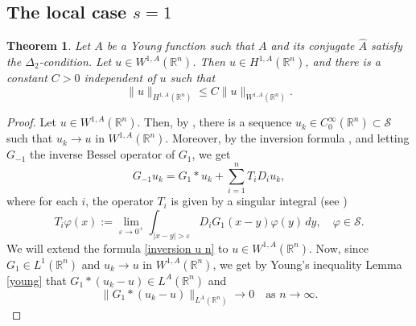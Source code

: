 \documentclass[leqno,twoside, 12pt]{amsart}
\theoremstyle{plain}
\numberwithin{equation}{section} \numberwithin{figure}{section}
\newtheorem{theorem}{Theorem}[section]
\theoremstyle{definition}
\numberwithin{equation}{section}
\begin{document}
\subsection{The local case $s=1$} 
\begin{theorem}\label{sobolev include in Bessel} Let $A$ be a Young function such that $A$ and its conjugate $\hat A$  satisfy the $\Delta_2$-condition. Let $u\in W^{1, A}(\mathbb{R}^n)$. Then $u\in H^{1, A}(\mathbb{R}^n)$, and there is a constant $C>0$ independent of $u$ such that
$$\|u\|_{H^{1, A}(\mathbb{R}^n)}\leq C\|u\|_{W^{1, A}(\mathbb{R}^n)}.$$
\end{theorem}
\begin{proof}
Let $u\in W^{1, A}(\mathbb{R}^n)$. Then, by \cite[Corollary 1.10]{G}, there is a sequence $u_k\in C_0^\infty(\mathbb{R}^n) \subset \mathcal{S}$ such that $u_k\to u$ in $W^{1, A}(\mathbb{R}^n)$. Moreover, by the inversion formula \cite[Eq. (5.30)]{AS}, and letting $G_{-1}$ the inverse Bessel operator of $G_1$, we get
\begin{equation}\label{inversion u n}
G_{-1}u_k=G_1*u_k + \sum_{i=1}^n T_iD_iu_k,
\end{equation}where for each $i$, the operator $T_i$ is given by a singular integral (see \cite[Eq. (5.7)]{AS})
\begin{equation}\label{operator T}
T_i\varphi(x):=\lim_{\varepsilon\to 0^+}\int_{|x-y|>\varepsilon}D_iG_1(x-y)\varphi(y)\,dy, \quad \varphi\in \mathcal{S}.
\end{equation}We will extend the formula \eqref{inversion u n} to $u\in W^{1, A}(\mathbb{R}^n)$. 
Now, since $G_1\in L^1(\mathbb{R}^n)$ and $u_k\to u$ in $W^{1, A}(\mathbb{R}^n)$, we get by Young's inequality Lemma \ref{young} that $G_1*(u_k-u) \in L^A(\mathbb{R}^n)$ and 
\begin{equation}\label{eq1}
 \|G_1*(u_k-u)\|_{L^A(\mathbb{R}^n)}\to 0 \quad \text{as }n\to \infty.
\end{equation}


\end{proof}
\end{document}
